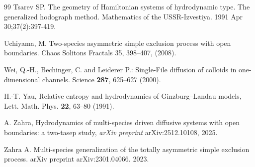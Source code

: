 \documentclass[12pt]{article}
\begin{document}
\begin{thebibliography}{99}
Tsarev SP. The geometry of Hamiltonian systems of hydrodynamic type. The generalized hodograph method. Mathematics of the USSR-Izvestiya. 1991 Apr 30;37(2):397-419.

Uchiyama, M. 
Two-species asymmetric simple exclusion process with open boundaries. 
Chaos Solitons Fractals 35, 398--407,  (2008).

 Wei, Q.-H., Bechinger, C. and Leiderer P.:  Single-File diffusion of colloids in one-dimensional channels. Science \textbf{287}, 625--627 (2000).



H.-T. Yau,
Relative entropy and hydrodynamics of Ginzburg--Landau models,
Lett. Math. Phys. \textbf{22}, 63--80 (1991).

A. Zahra, Hydrodynamics of multi-species driven diffusive systems with open boundaries: a two-tasep study,
\textit{arXiv preprint} arXiv:2512.10108, 2025.

Zahra A. Multi-species generalization of the totally asymmetric simple exclusion process. arXiv preprint arXiv:2301.04066. 2023.





\end{thebibliography}
\end{document}
